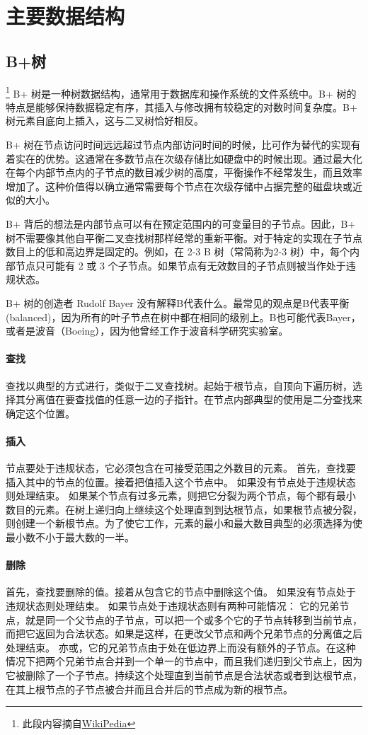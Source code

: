 \documentclass[UTF8]{ctexrep} %
\begin{document}
\section{主要数据结构}
\subsection{B+树}
\footnote{此段内容摘自\href{https://en.wikipedia.org/wiki/B+_tree}{WikiPedia}}
B+ 树是一种树数据结构，通常用于数据库和操作系统的文件系统中。B+ 树的特点是能够保持数据稳定有序，其插入与修改拥有较稳定的对数时间复杂度。B+ 树元素自底向上插入，这与二叉树恰好相反。
\par
B+ 树在节点访问时间远远超过节点内部访问时间的时候，比可作为替代的实现有着实在的优势。这通常在多数节点在次级存储比如硬盘中的时候出现。通过最大化在每个内部节点内的子节点的数目减少树的高度，平衡操作不经常发生，而且效率增加了。这种价值得以确立通常需要每个节点在次级存储中占据完整的磁盘块或近似的大小。
\par
B+ 背后的想法是内部节点可以有在预定范围内的可变量目的子节点。因此，B+ 树不需要像其他自平衡二叉查找树那样经常的重新平衡。对于特定的实现在子节点数目上的低和高边界是固定的。例如，在 2-3 B 树（常简称为2-3 树）中，每个内部节点只可能有 2 或 3 个子节点。如果节点有无效数目的子节点则被当作处于违规状态。
\par
B+ 树的创造者 Rudolf Bayer 没有解释B代表什么。最常见的观点是B代表平衡(balanced)，因为所有的叶子节点在树中都在相同的级别上。B也可能代表Bayer，或者是波音（Boeing），因为他曾经工作于波音科学研究实验室。

\paragraph{查找}
查找以典型的方式进行，类似于二叉查找树。起始于根节点，自顶向下遍历树，选择其分离值在要查找值的任意一边的子指针。在节点内部典型的使用是二分查找来确定这个位置。

\paragraph{插入}
节点要处于违规状态，它必须包含在可接受范围之外数目的元素。
首先，查找要插入其中的节点的位置。接着把值插入这个节点中。
如果没有节点处于违规状态则处理结束。
如果某个节点有过多元素，则把它分裂为两个节点，每个都有最小数目的元素。在树上递归向上继续这个处理直到到达根节点，如果根节点被分裂，则创建一个新根节点。为了使它工作，元素的最小和最大数目典型的必须选择为使最小数不小于最大数的一半。

\paragraph{删除}
首先，查找要删除的值。接着从包含它的节点中删除这个值。
如果没有节点处于违规状态则处理结束。
如果节点处于违规状态则有两种可能情况：
它的兄弟节点，就是同一个父节点的子节点，可以把一个或多个它的子节点转移到当前节点，而把它返回为合法状态。如果是这样，在更改父节点和两个兄弟节点的分离值之后处理结束。
亦或，它的兄弟节点由于处在低边界上而没有额外的子节点。在这种情况下把两个兄弟节点合并到一个单一的节点中，而且我们递归到父节点上，因为它被删除了一个子节点。持续这个处理直到当前节点是合法状态或者到达根节点，在其上根节点的子节点被合并而且合并后的节点成为新的根节点。
\end{document}
